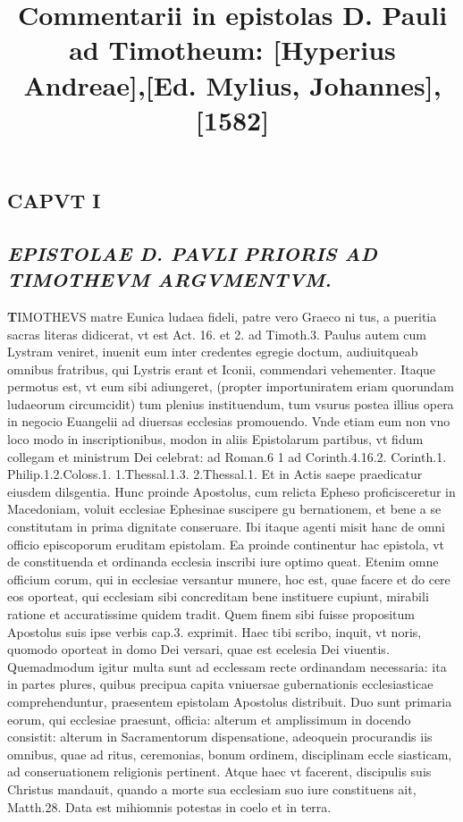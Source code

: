 \documentclass{article}
\begin{document}
\date{}
        \title{Commentarii in epistolas D. Pauli ad Timotheum: [Hyperius Andreae],[Ed. Mylius, Johannes], [1582]}
\maketitle
\tableofcontents
\clearpage
\begin{pages} 
\beginnumbering
        
\marginpar{[ p.1 ]}
\section{CAPVT I}
{}
\subsection*{\textit{EPISTOLAE D. PAVLI PRIORIS AD TIMOTHEVM ARGVMENTVM. }}\pstart \huge\textbf{T}\normalsize IMOTHEVS matre Eunica ludaea fideli, patre vero Graeco ni tus, a pueritia sacras literas didicerat, vt est Act. 16. et 2. ad Timoth.3. Paulus autem cum Lystram veniret, inuenit eum inter credentes egregie doctum, audiuitqueab omnibus fratribus, qui Lystris erant et Iconii, commendari vehementer. Itaque  permotus est, vt eum sibi adiungeret, (propter importuniratem eriam quorundam ludaeorum circumcidit) tum plenius instituendum, tum vsurus postea illius opera in negocio Euangelii ad diuersas ecclesias promouendo. Vnde etiam eum non vno loco modo in inscriptionibus, modon in aliis Epistolarum partibus, vt fidum collegam et ministrum Dei celebrat: ad Roman.6 1 ad Corinth.4.16.2. Corinth.1. Philip.1.2.Coloss.1. 1.Thessal.1.3. 2.Thessal.1. Et in Actis saepe praedicatur eiusdem dilsgentia. Hunc proinde Apostolus, cum relicta Epheso proficisceretur in Macedoniam, voluit ecclesiae Ephesinae suscipere gu bernationem, et bene a se constitutam in prima dignitate conseruare. Ibi itaque  agenti misit hanc de omni officio episcoporum eruditam epistolam. Ea proinde continentur hac epistola, vt de constituenda et ordinanda ecclesia inscribi iure optimo queat. Etenim omne officium corum, qui in ecclesiae versantur munere, hoc est, quae facere et do cere eos oporteat, qui ecclesiam sibi concreditam bene instituere cupiunt, mirabili ratione et accuratissime quidem tradit. Quem finem sibi fuisse propositum Apostolus suis ipse verbis cap.3. exprimit. Haec tibi scribo, inquit, vt noris, quomodo oporteat in domo Dei versari, quae est ecelesia Dei viuentis. Quemadmodum igitur multa sunt ad ecclessam recte ordinandam necessaria: ita in partes plures, quibus precipua capita vniuersae gubernationis ecclesiasticae comprehenduntur, praesentem epistolam Apostolus distribuit. Duo sunt primaria eorum, qui ecclesiae praesunt, officia: alterum et amplissimum in docendo consistit: alterum in Sacramentorum dispensatione, adeoquein procurandis iis omnibus, quae ad ritus, ceremonias, bonum ordinem, disciplinam eccle siasticam, ad conseruationem religionis pertinent. Atque  haec vt facerent, discipulis suis Christus mandauit, quando a morte sua ecclesiam suo iure constituens ait, Matth.28.  \pend\pstart Data est mihiomnis potestas in coelo et in terra. 
\end{pages}
\end{document}

